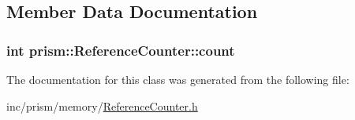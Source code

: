 \subsection{Member Data Documentation}
\subsubsection[{\texorpdfstring{count}{count}}]{\setlength{\rightskip}{0pt plus 5cm}int prism\+::\+Reference\+Counter\+::count}\hypertarget{classprism_1_1_reference_counter_a18e28845491bc0d8632a4075c8f341a9}{}\label{classprism_1_1_reference_counter_a18e28845491bc0d8632a4075c8f341a9}


The documentation for this class was generated from the following file\+:\begin{DoxyCompactItemize}
\item 
inc/prism/memory/\hyperlink{_reference_counter_8h}{Reference\+Counter.\+h}\end{DoxyCompactItemize}
